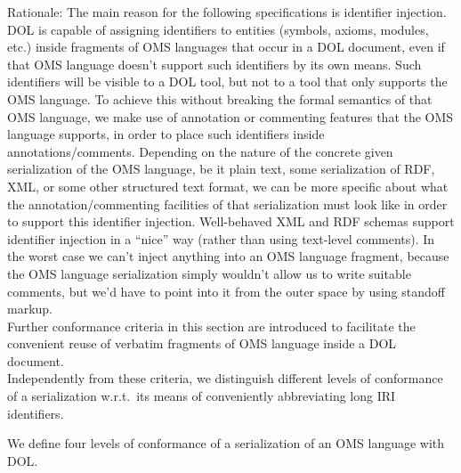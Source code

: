 \documentclass[10pt,%
\ifpretendfinal
final%
\else
draft%
\fi,
]{scrreprt}
\begin{document}
Rationale: The main reason for the following specifications is identifier injection.  DOL is capable of assigning identifiers to entities (symbols, axioms, modules, etc.) inside fragments of OMS languages that occur in a DOL document, even if that OMS language doesn't support such identifiers by its own means.  Such identifiers will be visible to a DOL tool, but not to a tool that only supports the OMS language.  To achieve this without breaking the formal semantics of that OMS language, we make use of annotation or commenting features that the OMS language supports, in order to place such identifiers inside annotations/comments.  Depending on the nature of the concrete given serialization of the OMS language, be it plain text, some serialization of RDF, XML, or some other structured text format, we can be more specific about what the annotation/commenting facilities of that serialization must look like in order to support this identifier injection.  Well-behaved XML and RDF schemas support identifier injection in a “nice” way (rather than using text-level comments).  In the worst case we can't inject anything into an OMS language fragment, because the OMS language serialization simply wouldn't allow us to write suitable comments, but we'd have to point into it from the outer space by using standoff markup.\\
Further conformance criteria in this section are introduced to facilitate the convenient reuse of verbatim fragments of OMS language inside a DOL document.\\
Independently from these criteria, we distinguish different levels of conformance of a serialization w.r.t.\ its means of conveniently abbreviating long IRI identifiers.

We define four levels of conformance of a serialization of an OMS language with DOL.
\end{document}
